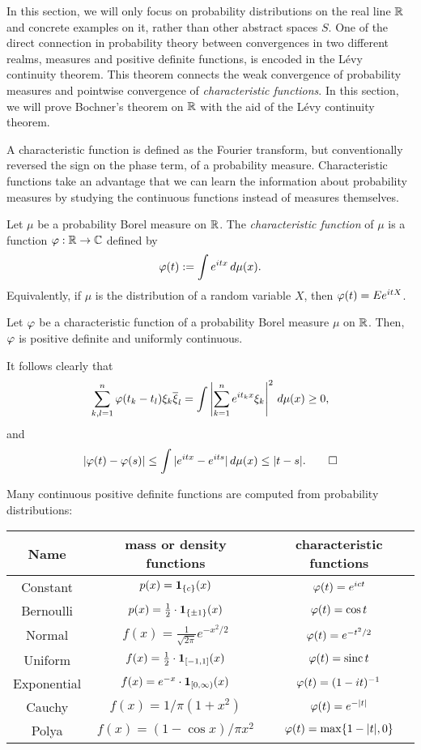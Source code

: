 \documentclass[a4paper]{article}
\begin{document}
In this section, we will only focus on probability distributions on the real line $\mathbb{R}$ and concrete examples on it, rather than other abstract spaces $S$.
One of the direct connection in probability theory between convergences in two different realms, measures and positive definite functions, is encoded in the L\'evy continuity theorem.
This theorem connects the weak convergence of probability measures and pointwise convergence of \emph{characteristic functions}.
In this section, we will prove Bochner's theorem on $\mathbb{R}$ with the aid of the L\'evy continuity theorem.

A characteristic function is defined as the Fourier transform, but conventionally reversed the sign on the phase term, of a probability measure.
Characteristic functions take an advantage that we can learn the information about probability measures by studying the continuous functions instead of measures themselves.

\begin{defn}
Let $\mu$ be a probability Borel measure on $\mathbb{R}$.
The \emph{characteristic function} of $\mu$ is a function $\varphi:\mathbb{R}\to\mathbb{C}$ defined by
\[\varphi(t):=\int e^{itx}\,d\mu(x).\]
Equivalently, if $\mu$ is the distribution of a random variable $X$, then $\varphi(t)=Ee^{itX}$.
\end{defn}

\begin{prop}
Let $\varphi$ be a characteristic function of a probability Borel measure $\mu$ on $\mathbb{R}$.
Then, $\varphi$ is positive definite and uniformly continuous.
\end{prop}
\begin{pf}
It follows clearly that
\[\sum_{k,l=1}^n\varphi(t_k-t_l)\xi_k\overline\xi_l=\int\left|\sum_{k=1}^ne^{it_kx}\xi_k\right|^2\,d\mu(x)\ge0,\]
and
\[|\varphi(t)-\varphi(s)|\le\int|e^{itx}-e^{its}|\,d\mu(x)\le|t-s|.\qedhere\]
\end{pf}
\begin{ex}
Many continuous positive definite functions are computed from probability distributions:
\begin{center}\renewcommand{\arraystretch}{1.8}
\begin{tabular}{ccc}
Name & mass or density functions & characteristic functions\\\hline
Constant & $p(x)=\mathbf{1}_{\{c\}}(x)$ & $\varphi(t)=e^{ict}$\\
Bernoulli & $p(x)=\frac12\cdot\mathbf{1}_{\{\pm1\}}(x)$ & $\varphi(t)=\cos t$\\
Normal & $f(x)=\frac1{\sqrt{2\pi}}e^{-x^2/2}$ & $\varphi(t)=e^{-t^2/2}$\\
Uniform & $f(x)=\frac12\cdot\mathbf{1}_{[-1,1]}(x)$ & $\varphi(t)=\operatorname{sinc}t$\\
Exponential & $f(x)=e^{-x}\cdot\mathbf{1}_{[0,\infty)}(x)$ & $\varphi(t)=(1-it)^{-1}$\\
Cauchy & $f(x)=1/\pi(1+x^2)$ & $\varphi(t)=e^{-|t|}$\\
Polya & $f(x)=(1-\cos x)/\pi x^2$ & $\varphi(t)=\max\{1-|t|,0\}$
\end{tabular}
\end{center}
\end{ex}
\end{document}
